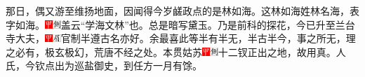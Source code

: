 那日，偶又游至维扬地面，因闻得今岁鹾政点的是林如海。这林如海姓林名海，表字如海。{\includegraphics[width=3mm]{../Images/00002}\includegraphics[width=3mm]{../Images/00011}\footnotesize \kaishu 盖云``学海文林''也。总是暗写黛玉。}乃是前科的探花，今已升至兰台寺大夫，{\includegraphics[width=3mm]{../Images/00002}\includegraphics[width=3mm]{../Images/00010}\footnotesize \kaishu 官制半遵古名亦好。余最喜此等半有半无，半古半今，事之所无，理之必有，极玄极幻，荒唐不经之处。}本贯姑苏{\includegraphics[width=3mm]{../Images/00002}\includegraphics[width=3mm]{../Images/00011}\footnotesize \kaishu 十二钗正出之地，故用真。}人氏，今钦点出为巡盐御史，到任方一月有馀。


